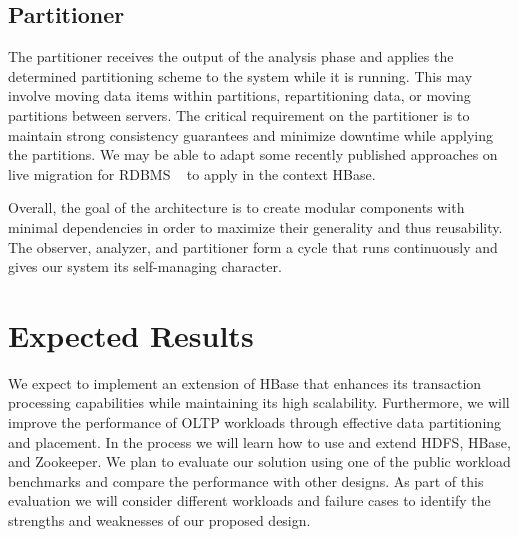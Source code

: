 \documentclass[10pt,final,journal]{IEEEtran}
\begin{document}
\subsection{Partitioner}
The partitioner receives the output of the analysis phase and applies the determined partitioning scheme to the system while it is running. This may involve moving data items within partitions, repartitioning data, or moving partitions between servers. The critical requirement on the partitioner is to maintain strong consistency guarantees and minimize downtime while applying the partitions. We may be able to adapt some recently published approaches on live migration for RDBMS ~\cite{Das:2011:ALE:2002974.2002977, Elmore:2011:ZLM:1989323.1989356} to apply in the context HBase.

Overall, the goal of the architecture is to create modular components with minimal dependencies in order to maximize their generality and thus reusability. The observer, analyzer, and partitioner form a cycle that runs continuously and gives our system its self-managing character.

\section{Expected Results}
We expect to implement an extension of HBase that enhances its transaction processing capabilities while maintaining its high scalability. Furthermore, we will improve the performance of OLTP workloads through effective data partitioning and placement. In the process we will learn how to use and extend HDFS, HBase, and Zookeeper. We plan to evaluate our solution using one of the public workload benchmarks and compare the performance with other designs. As part of this evaluation we will consider different workloads and failure cases to identify the strengths and weaknesses of our proposed design.



\end{document}
